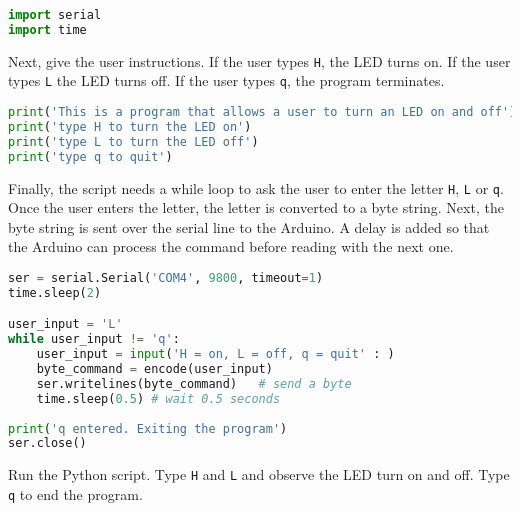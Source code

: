 \documentclass{book}
\newcommand{\passthrough}[1]{#1}
\begin{document}
    
        \begin{lstlisting}[language=Python]
import serial
import time
\end{lstlisting}
    




    
        Next, give the user instructions. If the user types
\passthrough{\lstinline!H!}, the LED turns on. If the user types
\passthrough{\lstinline!L!} the LED turns off. If the user types
\passthrough{\lstinline!q!}, the program terminates.
    




    
        \begin{lstlisting}[language=Python]
print('This is a program that allows a user to turn an LED on and off')
print('type H to turn the LED on')
print('type L to turn the LED off')
print('type q to quit')
\end{lstlisting}
    




    
        Finally, the script needs a while loop to ask the user to enter the
letter \passthrough{\lstinline!H!}, \passthrough{\lstinline!L!} or
\passthrough{\lstinline!q!}. Once the user enters the letter, the letter
is converted to a byte string. Next, the byte string is sent over the
serial line to the Arduino. A delay is added so that the Arduino can
process the command before reading with the next one.
    




    
        \begin{lstlisting}[language=Python]
ser = serial.Serial('COM4', 9800, timeout=1)
time.sleep(2)

user_input = 'L'
while user_input != 'q':
    user_input = input('H = on, L = off, q = quit' : )
    byte_command = encode(user_input)
    ser.writelines(byte_command)   # send a byte
    time.sleep(0.5) # wait 0.5 seconds
        
print('q entered. Exiting the program')
ser.close()
\end{lstlisting}
    




    
        Run the Python script. Type \passthrough{\lstinline!H!} and
\passthrough{\lstinline!L!} and observe the LED turn on and off. Type
\passthrough{\lstinline!q!} to end the program.
    
\end{document}
